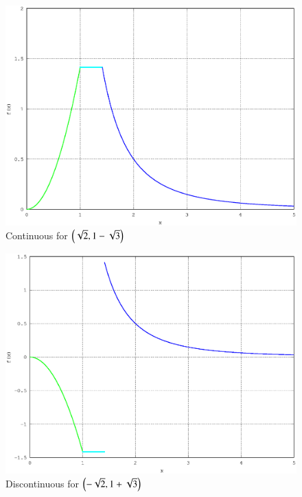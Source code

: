 \documentclass[journal,12pt,twocolumn]{IEEEtran}
\begin{document}
\renewcommand{\thefigure}{\theproblem.\arabic{figure}}
\begin{figure}[h]
\centering
\includegraphics[width=\columnwidth]{./figs/ee16b1019a}
\caption{ Continuous for $\left(\sqrt{2}, 1 - \sqrt{3}\right)$}
\end{figure}
%
\begin{figure}[h]
\centering
\includegraphics[width=\columnwidth]{./figs/ee16b1019b}
\caption{ Discontinuous for $\left(-\sqrt{2}, 1 + \sqrt{3}\right)$}
\end{figure}
%
\end{document}
